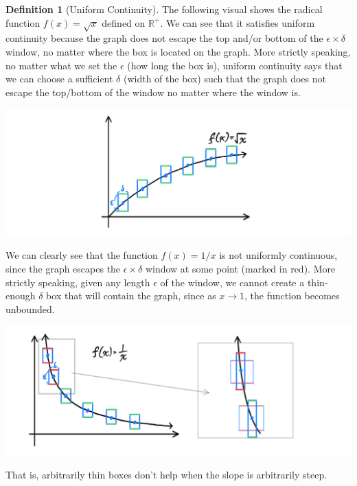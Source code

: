 \documentclass{article}
\theoremstyle{remark}
\theoremstyle{definition}
\newtheorem{definition}{Definition}[section]
\begin{document}
\begin{definition}[Uniform Continuity]
The following visual shows the radical function $f(x) = \sqrt{x}$ defined on $\mathbb{R}^+$. We can see that it satisfies uniform continuity because the graph does not escape the top and/or bottom of the $\epsilon \times \delta$ window, no matter where the box is located on the graph. More strictly speaking, no matter what we set the $\epsilon$ (how long the box is), uniform continuity says that we can choose a sufficient $\delta$ (width of the box) such that the graph does not escape the top/bottom of the window no matter where the window is. 
\begin{center}
    \includegraphics[scale=0.28]{img/Uniform_Continuity_Radical.PNG}
\end{center}
We can clearly see that the function $f(x) = 1/x$ is not uniformly continuous, since the graph escapes the $\epsilon \times \delta$ window at some point (marked in red). More strictly speaking, given any length $\epsilon$ of the window, we cannot create a thin-enough $\delta$ box that will contain the graph, since as $x \rightarrow 1$, the function becomes unbounded. 
\begin{center}
    \includegraphics[scale=0.3]{img/Uniform_Continuity_Rational.PNG}
\end{center}
That is, arbitrarily thin boxes don't help when the slope is arbitrarily steep. 
\end{definition}
\end{document}
